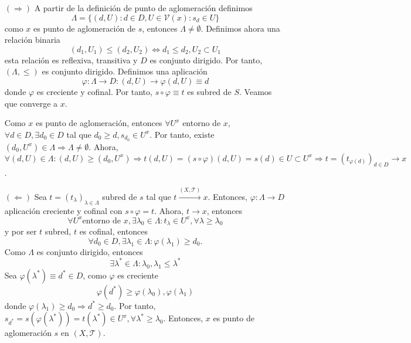 \begin{dem}
  \begin{enumerate}[label=(\roman*)]
    \item []
    \item [$(\Rightarrow)$] A partir de la definición de punto de aglomeración definimos
      \[ 
        \Lambda = \big\{ (d,U) : d \in D, U \in \mathcal{V}(x) : s_{d} \in U \big\} 
      \] 
      como $x$ es punto de aglomeración de $s$, entonces $\Lambda \neq \emptyset$. Definimos ahora una relación binaria
      \[ 
        (d_{1}, U_{1}) \leq (d_{2}, U_{2}) \Leftrightarrow d_{1} \leq d_{2}, U_{2} \subset U_{1} 
      \] 
     esta relación es reflexiva, transitiva y $D$ es conjunto dirigido. Por tanto, $(\Lambda, \leq)$ es conjunto dirigido. Definimos una aplicación
     \[ 
       \varphi : \Lambda \to D : (d, U) \rightarrow \varphi(d, U) \equiv d 
     \] 
     donde $\varphi$ es creciente y cofinal. Por tanto, $s \circ \varphi \equiv t$ es subred de $S$. Veamos que converge a $x$. 

     Como $x$ es punto de aglomeración, entonces $\forall U^{x}$ entorno de $x$, $\forall d \in D, \exists d_{0} \in D$ tal que $d_{0} \geq d, s _{ d_{ 0 } } \in U^{x}$. Por tanto, existe $(d_{0}, U^{x}) \in \Lambda \Rightarrow \Lambda \neq \emptyset$. Ahora, $\forall (d, U) \in \Lambda : (d,U) \geq (d_{0}, U^{x}) \Rightarrow t(d, U) = (s \circ \varphi)(d, U) = s(d) \in U \subset U^{x} \Rightarrow t = (t_{\varphi(d)})_{d \in D} \rightarrow x$.
   \item [$(\Leftarrow)$] Sea $t = (t_{\lambda})_{\lambda \in \Lambda}$ subred de $s$ tal que $t \xrightarrow[]{ ( X, \mathcal{T} ) } x$. Entonces, $\varphi :  \Lambda \to D $ aplicación creciente y cofinal con $s \circ \varphi = t$. Ahora, $t \rightarrow x$, entonces 
  \[
    \forall U^{x} \text{entorno de $x$}, \exists \lambda_{0} \in \Lambda : t_{\lambda} \in U^{x}, \forall \lambda \geq \lambda_{0}
  \]
     y por ser $t$ subred, $t$ es cofinal, entonces
     \[
       \forall d_{0} \in D, \exists \lambda_{1} \in \Lambda : \varphi(\lambda_{1}) \geq d_{0}.
     \]
     Como $\Lambda$ es conjunto dirigido, entonces
     \[
       \exists \lambda^* \in \Lambda : \lambda_{0}, \lambda_{1} \leq \lambda^* 
     \] 
     Sea $\varphi(\lambda^*) \equiv d^* \in D$, como $\varphi$ es creciente
     \[
       \varphi(d^*) \geq \varphi(\lambda_{0}), \varphi(\lambda_{1})
     \]
     donde $\varphi(\lambda_{1}) \geq d_{0} \Rightarrow d^* \geq d_{0}$. Por tanto, $s_{d^*} = s(\varphi(\lambda^*)) = t(\lambda^*) \in U^{x}, \forall \lambda^* \geq \lambda_{0}$. Entonces, $x$ es punto de aglomeración $s$ en $( X, \mathcal{T} )$.
  \end{enumerate}
\end{dem}
